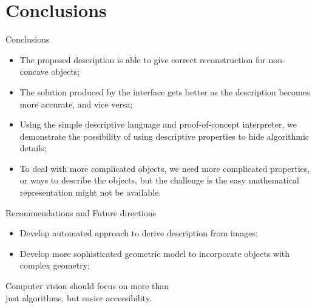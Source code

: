 \documentclass[10pt]{beamer}
\begin{document}
\section{Conclusions}
\begin{frame}{Conclusions}

\begin{itemize}
\item The proposed description is able to give correct reconstruction for non-concave objects;
\item The solution produced by the interface gets better as the description becomes more accurate, and vice versa;
\item Using the simple descriptive language and proof-of-concept interpreter, we demonstrate the possibility of using descriptive properties to hide algorithmic details;
\item To deal with more complicated objects, we need more complicated properties, or ways to describe the objects, but the challenge is the easy mathematical representation might not be available.
\end{itemize}

\end{frame}

\begin{frame}{Recommendations and Future directions}

\begin{itemize}
\item Develop automated approach to derive description from images;
\item Develop more sophisticated geometric model to incorporate objects with complex geometry;
\end{itemize}

\end{frame}

\begin{frame}[standout]

Computer vision should focus on more than \\just algorithms, but easier accessibility.

\end{frame}

\end{document}
